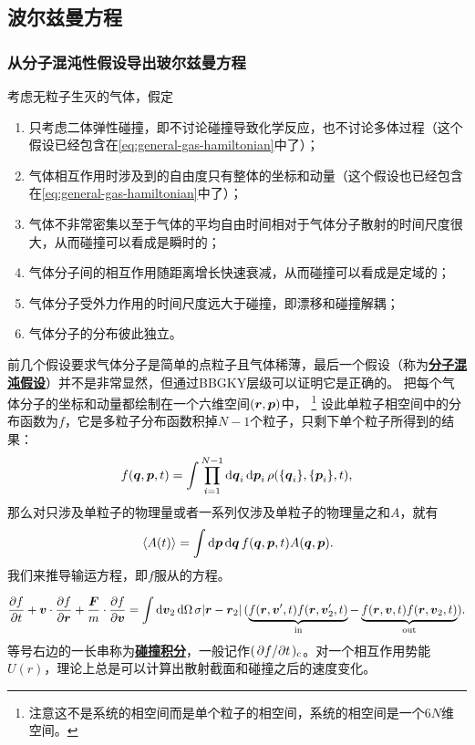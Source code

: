 \documentclass[hyperref, UTF8, a4paper]{ctexart}
\newcommand{\concept}[1]{\underline{\textbf{#1}}}
\begin{document}
\subsection{波尔兹曼方程}

\subsubsection{从分子混沌性假设导出玻尔兹曼方程}

考虑无粒子生灭的气体，假定
\begin{enumerate}
    \item 只考虑二体弹性碰撞，即不讨论碰撞导致化学反应，也不讨论多体过程（这个假设已经包含在\eqref{eq:general-gas-hamiltonian}中了）；
    \item 气体相互作用时涉及到的自由度只有整体的坐标和动量（这个假设也已经包含在\eqref{eq:general-gas-hamiltonian}中了）；
    \item 气体不非常密集以至于气体的平均自由时间相对于气体分子散射的时间尺度很大，从而碰撞可以看成是瞬时的；
    \item 气体分子间的相互作用随距离增长快速衰减，从而碰撞可以看成是定域的；
    \item 气体分子受外力作用的时间尺度远大于碰撞，即漂移和碰撞解耦；
    \item 气体分子的分布彼此独立。
\end{enumerate}
前几个假设要求气体分子是简单的点粒子且气体稀薄，最后一个假设（称为\concept{分子混沌假设}）并不是非常显然，但通过BBGKY层级可以证明它是正确的。
把每个气体分子的坐标和动量都绘制在一个六维空间$(\vb*{r}, \vb*{p})$中，%
\footnote{注意这不是系统的相空间而是单个粒子的相空间，系统的相空间是一个$6N$维空间。}%
设此单粒子相空间中的分布函数为$f$，它是多粒子分布函数积掉$N-1$个粒子，只剩下单个粒子所得到的结果：
\begin{equation}
    f(\vb*{q}, \vb*{p}, t) = \int \prod_{i=1}^{N-1} \dd{\vb*{q}_i} \dd{\vb*{p}_i} \rho(\{\vb*{q}_i\}, \{\vb*{p}_i\}, t),
\end{equation}
那么对只涉及单粒子的物理量或者一系列仅涉及单粒子的物理量之和$A$，就有
\begin{equation}
    \expval*{A(t)} = \int \dd{\vb*{p}} \dd{\vb*{q}} f(\vb*{q}, \vb*{p}, t) A(\vb*{q}, \vb*{p}).
\end{equation}
我们来推导输运方程，即$f$服从的方程。

\begin{equation}
    \pdv{f}{t} + \vb*{v} \cdot \pdv{f}{\vb*{r}} + \frac{\vb*{F}}{m} \cdot \pdv{f}{\vb*{v}} = \int \dd{\vb*{v}_2} \dd{\Omega} \sigma \abs*{\vb*{r}-\vb*{r}_2} (\underbrace{f(\vb*{r}, \vb*{v}', t) f(\vb*{r}, \vb*{v}'_{2}, t)}_\text{in} - \underbrace{f(\vb*{r}, \vb*{v}, t) f(\vb*{r}, \vb*{v}_{2}, t)}_\text{out}).
    \label{eq:boltzmann-eq}
\end{equation}
等号右边的一长串称为\concept{碰撞积分}，一般记作$(\pdv*{f}{t})_\text{c}$。对一个相互作用势能$U(r)$，理论上总是可以计算出散射截面和碰撞之后的速度变化。
\end{document}
